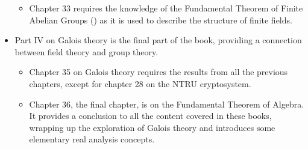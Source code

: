 \begin{itemize}
\begin{itemize}
        \item Chapter 33 requires the knowledge of the Fundamental Theorem of Finite Abelian Groups () as it is used to describe the structure of finite fields.
    \end{itemize}
    \item Part IV on Galois theory is the final part of the book, providing a connection between field theory and group theory.
    \begin{itemize}
        \item Chapter 35 on Galois theory requires the results from all the previous chapters, except for chapter 28 on the NTRU cryptosystem.
        \item Chapter 36, the final chapter, is on the Fundamental Theorem of Algebra. It provides a conclusion to all the content covered in these books, wrapping up the exploration of Galois theory and introduces some elementary real analysis concepts.
    \end{itemize}
\end{itemize}
